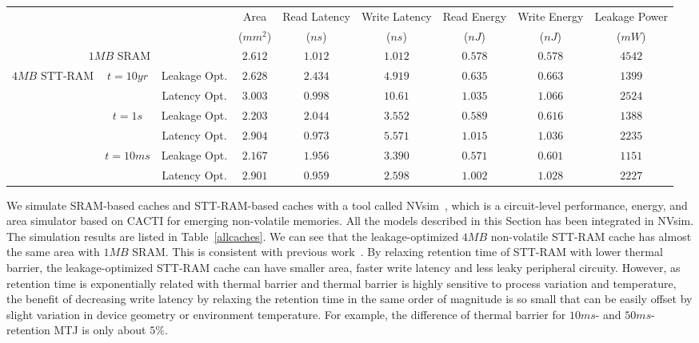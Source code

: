 \begin{table*}[t]
 \scriptsize
  \centering
  \caption{16-way L2 Cache Simulation Results}
  \label{allcaches}
  \begin{tabular}{| c | c | c  | c | c | c | c | c | c |}
  	\hline\hline
  	\multirow{2}{*}{} & \multirow{2}{*}{} & \multirow{2}{*}{} & Area  & Read Latency & Write Latency & Read Energy & Write Energy & Leakage Power\\
  & & & ($mm^2$) & ($ns$) & ($ns$) & ($nJ$) & ($nJ$) & ($mW$) \\
  	\hline\hline
  	\multicolumn{3}{|c|}{$1MB$ SRAM} & $2.612$ & $1.012$ & $1.012$ & $0.578$ & $0.578$ &$4542$ \\
  	\hline
  	\multirow{8}{*}{$4MB$ STT-RAM} & \multirow{2}{*}{$t=10yr$} & Leakage Opt.& $2.628$ & $2.434$ & $4.919$ & $0.635$ & $0.663$ & $1399$ \\
  	\cline{3-3}\cline{4-9}
  	& & Latency Opt. & $3.003$ & $0.998$ & $10.61$ & $1.035$ & $1.066$ & $2524$ \\
  	\cline{2-3}\cline{4-9}
  	& \multirow{2}{*}{$t=1s$} & Leakage Opt. & $2.203$ & $2.044$ & $3.552$ & $0.589$ & $0.616$ & $1388$ \\
  	\cline{3-3}\cline{4-9}
  	& & Latency Opt. & $2.904$ & $0.973$ & $5.571$ & $1.015$ & $1.036$ & $2235$ \\
  	\cline{2-3}\cline{4-9}
    & \multirow{2}{*}{$t=10ms$} & Leakage Opt. & $2.167$ & $1.956$ & $3.390$ & $0.571$ & $0.601$ & $1151$ \\
  	\cline{3-3}\cline{4-9}
  	& & Latency Opt. & $2.901$ & $0.959$ & $2.598$ & $1.002$ & $1.028$ & $2227$ \\	
  	\hline\hline
  \end{tabular}
\end{table*}

We simulate SRAM-based caches and STT-RAM-based caches with a tool called NVsim~\cite{CACTI:PCRAMsim}, which is a circuit-level performance, energy, and area simulator based on CACTI for emerging non-volatile memories. All the models described in this Section has been integrated in NVsim. The simulation results are listed in Table~\ref{allcaches}. We can see that the leakage-optimized $4MB$ non-volatile STT-RAM cache has almost the same area with $1MB$ SRAM. This is consistent with previous work~\cite{CACTI:DAC08:Dong}. By relaxing retention time of STT-RAM with lower thermal barrier, the leakage-optimized STT-RAM cache can have smaller area, faster write latency and less leaky peripheral circuity. However, as retention time is exponentially related with thermal barrier and thermal barrier is highly sensitive to process variation and temperature, the benefit of decreasing write latency by relaxing the retention time in the same order of magnitude is so small that can be easily offset by slight variation in device geometry or environment temperature. For example, the difference of thermal barrier for $10ms$- and $50ms$- retention MTJ is only about $5\%$. 

